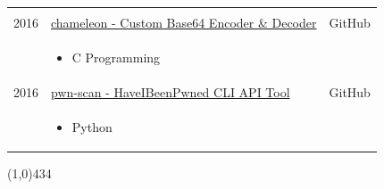 \documentclass{res}
\newcommand{\frstCVcell}{2.5cm}
\begin{document}
\begin{resume}
\begin{tabularx}{\textwidth}{p{\frstCVcell}Xc}
    & \\
    2016 & \href{https://github.com/lillypad/chameleon}{chameleon - Custom Base64 Encoder \& Decoder} & GitHub\\
    &
    \begin{itemize}
    \item C Programming
    \end{itemize}
    & \\
    2016 & \href{https://github.com/lillypad/pwn-scan}{pwn-scan - HaveIBeenPwned CLI API Tool} & GitHub\\
    &
    \begin{itemize}
    \item Python
    \end{itemize}
    & \\
    \end{tabularx}
  \newline
  \line(1,0){434}

  \pagebreak

\end{resume}
\end{document}
